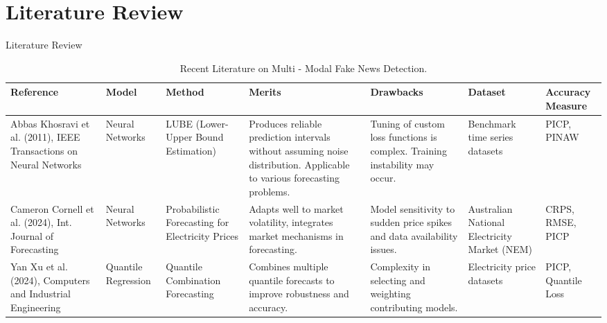 \documentclass[xcolor=dvipsnames,aspectratio=169]{beamer}
\begin{document}










		
\section{Literature Review}
\begin{frame}{Literature Review}
    \begin{table}[]
    \caption{Recent Literature on Multi - Modal Fake News Detection.}
    \centering
    {\tiny %
    \begin{tabular}{|p{2.0cm}|p{1.0cm}|p{1.5cm}|p{2.5cm}|p{2.5cm}|p{1.5cm}|p{1.0cm}|}
    \hline
    \textbf{Reference} & \textbf{Model} & \textbf{Method} & \textbf{Merits} & \textbf{Drawbacks} & \textbf{Dataset} & \textbf{Accuracy Measure} \\ \hline
    
    Abbas Khosravi et al. (2011), IEEE Transactions on Neural Networks \cite{12} & Neural Networks & LUBE (Lower-Upper Bound Estimation) & Produces reliable prediction intervals without assuming noise distribution. Applicable to various forecasting problems. & Tuning of custom loss functions is complex. Training instability may occur. & Benchmark time series datasets & PICP, PINAW \\ \hline
    
    Cameron Cornell et al. (2024), Int. Journal of Forecasting \cite{2} & Neural Networks & Probabilistic Forecasting for Electricity Prices & Adapts well to market volatility, integrates market mechanisms in forecasting. & Model sensitivity to sudden price spikes and data availability issues. & Australian National Electricity Market (NEM) & CRPS, RMSE, PICP \\ \hline
    
    Yan Xu et al. (2024), Computers and Industrial Engineering \cite{9} & Quantile Regression & Quantile Combination Forecasting & Combines multiple quantile forecasts to improve robustness and accuracy. & Complexity in selecting and weighting contributing models. & Electricity price datasets & PICP, Quantile Loss \\ \hline
    

\end{tabular}}
\end{table}
\end{frame}
\end{document}
